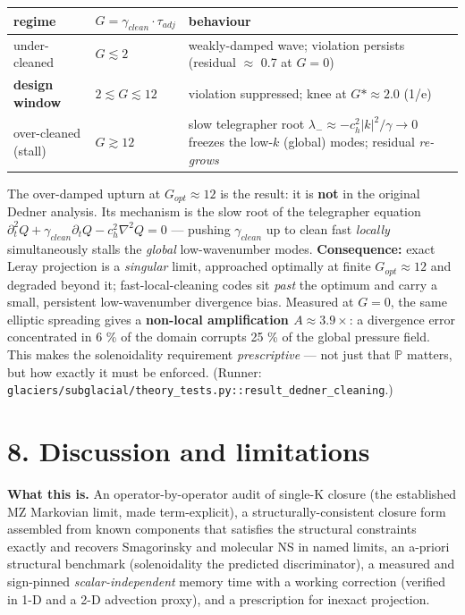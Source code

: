 \documentclass[aps,prfluids,preprint,superscriptaddress,nofootinbib]{revtex4-2}
\newcommand{\code}[1]{\texttt{#1}}
\begin{document}
\begin{center}\small
\begin{tabularx}{\linewidth}{>{\raggedright\arraybackslash}X>{\raggedright\arraybackslash}X>{\raggedright\arraybackslash}X}
\toprule
regime & $G = \gamma _{clean}\cdot \tau _{adj}$ & behaviour \\
\midrule
under-cleaned & $G \lesssim  2$ & weakly-damped wave; violation persists (residual \ensuremath{\approx} 0.7 at $G=0$) \\
\textbf{design window} & \textbf{$2 \lesssim  G \lesssim  12$} & violation suppressed; knee at $G*\approx 2.0$ (1/e) \\
over-cleaned (stall) & $G \gtrsim  12$ & slow telegrapher root $\lambda _{-} \approx  -c_{h}^{2}|k|^{2}/\gamma  \to  0$ freezes the low-$k$ (global) modes; residual \emph{re-grows} \\
\bottomrule
\end{tabularx}
\end{center}

The over-damped upturn at $G_{opt}\approx 12$ is the result: it is \textbf{not} in the original Dedner analysis. Its mechanism is the slow root of the telegrapher equation $\partial _{t}^{2}Q + \gamma _{clean} \partial _{t} Q - c_{h}^{2}\nabla ^{2}Q = 0$ — pushing $\gamma _{clean}$ up to clean fast \emph{locally} simultaneously stalls the \emph{global} low-wavenumber modes. \textbf{Consequence:} exact Leray projection is a \emph{singular} limit, approached optimally at finite $G_{opt}\approx 12$ and degraded beyond it; fast-local-cleaning codes sit \emph{past} the optimum and carry a small, persistent low-wavenumber divergence bias. Measured at $G=0$, the same elliptic spreading gives a \textbf{non-local amplification $A\approx 3.9\times $}: a divergence error concentrated in 6 \% of the domain corrupts 25 \% of the global pressure field. This makes the solenoidality requirement \emph{prescriptive} — not just that $\mathbb{P}$ matters, but how exactly it must be enforced. (Runner: \code{glaciers/\allowbreak{}subglacial/\allowbreak{}theory\_\allowbreak{}tests.\allowbreak{}py::result\_\allowbreak{}dedner\_\allowbreak{}cleaning}.)

\section*{8. Discussion and limitations}

\textbf{What this is.} An operator-by-operator audit of single-K closure (the established MZ Markovian limit, made term-explicit), a structurally-consistent closure form assembled from known components that satisfies the structural constraints exactly and recovers Smagorinsky and molecular NS in named limits, an a-priori structural benchmark (solenoidality the predicted discriminator), a measured and sign-pinned \emph{scalar-independent} memory time with a working correction (verified in 1-D and a 2-D advection proxy), and a prescription for inexact projection.
\end{document}
